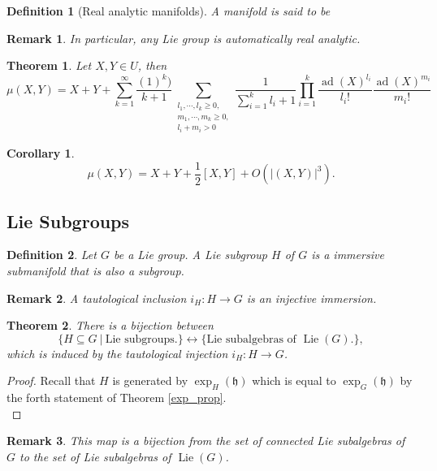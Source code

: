 \documentclass{article}
\newtheorem{theorem}{Theorem}[section]
\newtheorem{definition}{Definition}[section]
\newtheorem{remark}{Remark}[section]
\newtheorem{corollary}{Corollary}[section]
\numberwithin{equation}{section}
\DeclareMathOperator{\ad}{ad}
\DeclareMathOperator{\Lie}{Lie}
\begin{document}
\begin{definition}[Real analytic manifolds]
A manifold is said to be%
\end{definition}

\begin{remark}
In particular, any Lie group is automatically real analytic.
\end{remark}

\begin{theorem}
Let $X,Y\in U$, then 
\begin{equation*}
\mu(X, Y) = X+Y+\sum_{k=1}^\infty {\frac {(1)^k)} {k+1}}\sum_{\substack{l_1,\cdots,l_k\geq0,\\m_1, \cdots,m_k\geq0,\\l_i+m_i>0}}
{\frac 1 {\sum_{i=1}^k l_i +1}}\prod_{i=1}^k{\frac {\ad(X)^{l_i}} {l_i!}}{\frac {\ad(X)^{m_i}} {m_i!}}
\end{equation*}
\end{theorem}

\begin{corollary}
\begin{equation*}
\mu(X,Y)=X+Y+{\frac 1 2}[X,Y]+O(|(X,Y)|^3).
\end{equation*}
\end{corollary}

\subsection{Lie Subgroups}

\begin{definition}
Let $G$ be a Lie group. A Lie subgroup $H$ of $G$ is a immersive submanifold that is also a subgroup.
\end{definition}

\begin{remark}
A tautological inclusion $i_H:H\to G$ is an injective immersion.%
\end{remark}

\begin{theorem}
There is a bijection between
\begin{equation*}
\{H\subseteq G\:|\: \text{Lie subgroups.}\}\leftrightarrow\{\text{Lie subalgebras of $\Lie(G)$.}\},
\end{equation*}
which is induced by the tautological injection $i_H:H\to G$.
\end{theorem}

\begin{proof}
Recall that $H$ is generated by $\exp_H(\mathfrak{h})$ which is equal to $\exp_G(\mathfrak{h})$ by the forth statement of Theorem \ref{exp_prop}. \\
\par 
\end{proof}

\begin{remark}
This map is a bijection from the set of connected Lie subalgebras of $G$ to the set of Lie subalgebras of $\Lie(G)$. 
\end{remark}
\end{document}

